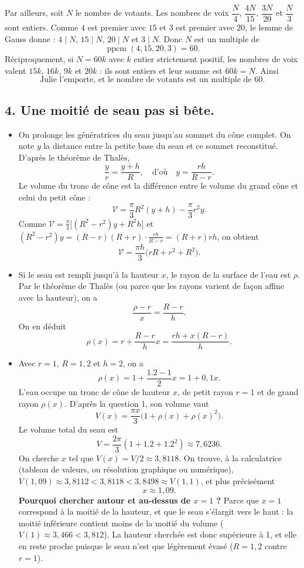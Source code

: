 Par ailleurs, soit $N$ le nombre de votants. Les nombres de voix $\dfrac{N}{4}$, $\dfrac{4N}{15}$, $\dfrac{3N}{20}$ et $\dfrac{N}{3}$ sont entiers. Comme $4$ est premier avec $15$ et $3$ est premier avec $20$, le lemme de Gauss donne : $4 \mid N$, $15 \mid N$, $20 \mid N$ et $3 \mid N$. Donc $N$ est un multiple de
\[\operatorname{ppcm}(4, 15, 20, 3) = 60.\]
Réciproquement, si $N = 60k$ avec $k$ entier strictement positif, les nombres de voix valent $15k$, $16k$, $9k$ et $20k$ : ils sont entiers et leur somme est $60k = N$. Ainsi
\[\boxed{\text{Julie l'emporte, et le nombre de votants est un multiple de 60.}}\]

\subsection*{4. Une moitié de seau pas si bête.}
\begin{itemize}
    \item On prolonge les génératrices du seau jusqu'au sommet du cône complet. On note \(y\) la distance entre la petite base du seau et ce sommet reconstitué.
    D'après le théorème de Thalès,
    \[\frac{y}{r} = \frac{y + h}{R},\quad\text{d'où}\quad y = \frac{rh}{R - r}.\]
    Le volume du tronc de cône est la différence entre le volume du grand cône et celui du petit cône :
    \[\mathcal{V} = \frac{\pi}{3}R^2(y + h) - \frac{\pi}{3}r^2y.\]
    Comme \(\mathcal{V} = \frac{\pi}{3}\bigl[(R^2 - r^2)y + R^2 h\bigr]\) et \((R^2 - r^2)y = (R - r)(R + r)\cdot\frac{rh}{R - r} = (R + r)rh\), on obtient
    \[\boxed{\mathcal{V} = \frac{\pi h}{3}\bigl(rR + r^2 + R^2\bigr)}.\]

    \item Si le seau est rempli jusqu'à la hauteur \(x\), le rayon de la surface de l'eau est \(\rho\). Par le théorème de Thalès (ou parce que les rayons varient de façon affine avec la hauteur), on a
    \[\frac{\rho - r}{x} = \frac{R - r}{h}.\]
    On en déduit
    \[\rho(x) = r + \frac{R - r}{h}x = \frac{rh + x(R - r)}{h}.\]

    \item Avec \(r = 1\), \(R = 1,2\) et \(h = 2\), on a
    \[\rho(x) = 1 + \frac{1.2 - 1}{2}x = 1 + 0,1x.\]
    L'eau occupe un tronc de cône de hauteur \(x\), de petit rayon \(r = 1\) et de grand rayon \(\rho(x)\). D'après la question 1, son volume vaut
    \[V(x) = \frac{\pi x}{3}\bigl(1 + \rho(x) + \rho(x)^2\bigr).\]
    Le volume total du seau est
    \[V = \frac{2\pi}{3}(1 + 1.2 + 1.2^2) \approx 7,6236.\]
    On cherche \(x\) tel que \(V(x) = V/2 \approx 3,8118\). On trouve, à la calculatrice (tableau de valeurs, ou résolution graphique ou numérique), \(V(1{,}09) \approx 3{,}8112 < 3{,}8118 < 3{,}8498 \approx V(1{,}1)\), et plus précisément
    \[x \approx 1{,}09.\]
    \textbf{Pourquoi chercher autour et au-dessus de \(x = 1\) ?} Parce que \(x = 1\) correspond à la moitié de la hauteur, et que le seau s’élargit vers le haut : la moitié inférieure contient moins de la moitié du volume (\(V(1) \approx 3{,}466 < 3{,}812\)). La hauteur cherchée est donc supérieure à 1, et elle en reste proche puisque le seau n’est que légèrement évasé (\(R = 1{,}2\) contre \(r = 1\)).
\end{itemize}

